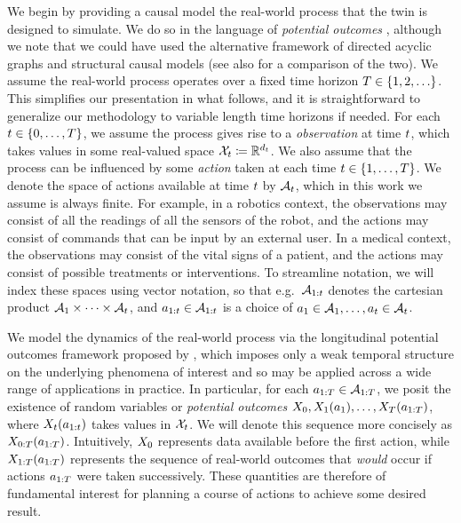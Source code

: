 We begin by providing a causal model the real-world process that the twin is designed to simulate.
We do so in the language of \emph{potential outcomes} \citep{rubin1974estimating,rubin2005causal}, although we note that we could have used the alternative framework of directed acyclic graphs and structural causal models \citep{pearl2009causality} (see also \cite{imbens2020potential} for a comparison of the two).
We assume the real-world process operates over a fixed time horizon $T \in \{1, 2, \ldots\}$.
This simplifies our presentation in what follows, and it is straightforward to generalize our methodology to variable length time horizons if needed.
For each $t \in \{0, \ldots, T\}$, we assume the process gives rise to a \emph{observation} at time $t$, which takes values in some real-valued space $\mathcal{X}_t \coloneqq \mathbb{R}^{d_t}$.
We also assume that the process can be influenced by some \emph{action} taken at each time $t \in \{1, \ldots, T\}$.
We denote the space of actions available at time $t$ by $\mathcal{A}_t$, which in this work we assume is always finite.
For example, in a robotics context, the observations may consist of all the readings of all the sensors of the robot, and the actions may consist of commands that can be input by an external user.
In a medical context, the observations may consist of the vital signs of a patient, and the actions may consist of possible treatments or interventions.
To streamline notation, we will index these spaces using vector notation, so that e.g.\ $\mathcal{A}_{1:t}$ denotes the cartesian product $\mathcal{A}_1 \times \cdots \times \mathcal{A}_t$, and $a_{1:t} \in \mathcal{A}_{1:t}$ is a choice of $a_1 \in \mathcal{A}_1, \ldots, a_t \in \mathcal{A}_t$.

We model the dynamics of the real-world process via the longitudinal potential outcomes framework proposed by \cite{robins1986new}, which imposes only a weak temporal structure on the underlying phenomena of interest and so may be applied across a wide range of applications in practice.
In particular, for each $a_{1:T} \in \mathcal{A}_{1:T}$, we posit the existence of random variables or \emph{potential outcomes} $X_0, X_1(a_1), \ldots, X_T(a_{1:T})$, where $X_t(a_{1:t})$ takes values in $\mathcal{X}_t$.
We will denote this sequence more concisely as $X_{0:T}(a_{1:T})$.
Intuitively, $X_0$ represents data available before the first action, while $X_{1:T}(a_{1:T})$ represents the sequence of real-world outcomes that \emph{would} occur if actions $a_{1:T}$ were taken successively.
These quantities are therefore of fundamental interest for planning a course of actions to achieve some desired result.

